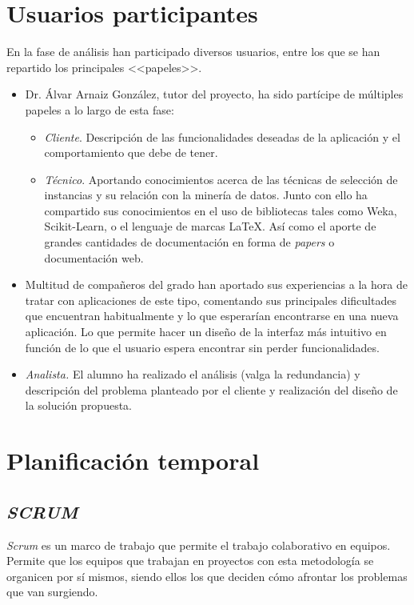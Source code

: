 \section{Usuarios participantes}\label{usuarios-participantes}
En la fase de análisis han participado diversos usuarios, entre los que se han repartido los principales <<papeles>>.
\begin{itemize}
\item Dr. Álvar Arnaiz González, tutor del proyecto, ha sido partícipe de múltiples papeles a lo largo de esta fase:
\begin{itemize}
\item \textit{Cliente}. Descripción de las funcionalidades deseadas de la aplicación y el comportamiento que debe de tener.
\item \textit{Técnico}. Aportando conocimientos acerca de las técnicas de selección de instancias y su relación con la minería de datos. Junto con ello ha compartido sus conocimientos en el uso de bibliotecas tales como Weka, Scikit-Learn, o el lenguaje de marcas \LaTeX. Así como el aporte de grandes cantidades de documentación en forma de \textit{papers} o documentación web. 
\end{itemize}
\item Multitud de compañeros del grado han aportado sus experiencias a la hora de tratar con aplicaciones de este tipo, comentando sus principales dificultades que encuentran habitualmente y lo que esperarían encontrarse en una nueva aplicación. Lo que permite hacer un diseño de la interfaz más intuitivo en función de lo que el usuario espera encontrar sin perder funcionalidades.
\item \textit{Analista.} El alumno ha realizado el análisis (valga la redundancia) y descripción del problema planteado por el cliente y realización del diseño de la solución propuesta.
\end{itemize}

\section{Planificación temporal}
\subsection{\textit{SCRUM}}
\textit{Scrum} es un marco de trabajo que permite el trabajo colaborativo en equipos. Permite que los equipos que trabajan en proyectos con esta metodología se organicen por sí mismos, siendo ellos los que deciden cómo afrontar los problemas que van surgiendo. 

